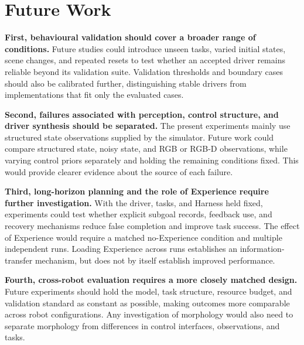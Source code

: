 \section[Future Work]{Future Work}

\textbf{First, behavioural validation should cover a broader range of
conditions.} Future studies could introduce unseen tasks, varied initial
states, scene changes, and repeated resets to test whether an accepted driver
remains reliable beyond its validation suite. Validation thresholds and
boundary cases should also be calibrated further, distinguishing stable
drivers from implementations that fit only the evaluated cases.

\textbf{Second, failures associated with perception, control structure, and
driver synthesis should be separated.} The present experiments mainly use
structured state observations supplied by the simulator. Future work could
compare structured state, noisy state, and RGB or RGB-D observations, while
varying control priors separately and holding the remaining conditions fixed.
This would provide clearer evidence about the source of each failure.

\textbf{Third, long-horizon planning and the role of Experience require
further investigation.} With the driver, tasks, and Harness held fixed,
experiments could test whether explicit subgoal records, feedback use, and
recovery mechanisms reduce false completion and improve task success. The
effect of Experience would require a matched no-Experience condition and
multiple independent runs. Loading Experience across runs establishes an
information-transfer mechanism, but does not by itself establish improved
performance.

\textbf{Fourth, cross-robot evaluation requires a more closely matched
design.} Future experiments should hold the model, task structure, resource
budget, and validation standard as constant as possible, making outcomes more
comparable across robot configurations. Any investigation of morphology would
also need to separate morphology from differences in control interfaces,
observations, and tasks.

